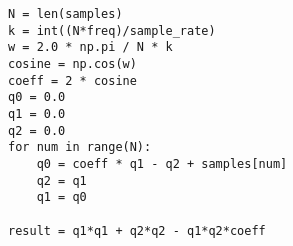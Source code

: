 
\begin{lstlisting}[caption={Algorytm Goertzla -- Python},label={lst:algg}]
N = len(samples)
k = int((N*freq)/sample_rate)
w = 2.0 * np.pi / N * k
cosine = np.cos(w)
coeff = 2 * cosine
q0 = 0.0
q1 = 0.0
q2 = 0.0
for num in range(N):
	q0 = coeff * q1 - q2 + samples[num]
	q2 = q1
	q1 = q0

result = q1*q1 + q2*q2 - q1*q2*coeff
\end{lstlisting}
\vspace{10pt}

